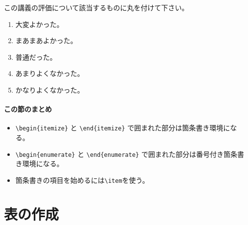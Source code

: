\vspace*{-1.5em}
\begin{kekka}
    この講義の評価について該当するものに丸を付けて下さい。
    \begin{enumerate}
        \item 大変よかった。
        \item まあまあよかった。
        \item 普通だった。
        \item あまりよくなかった。
        \item かなりよくなかった。
    \end{enumerate}
\end{kekka}


\paragraph{この節のまとめ}

\begin{itemize}
    \item \verb|\begin{itemize}| と \verb|\end{itemize}| で囲まれた部分は箇条書き環境になる。
    \item \verb|\begin{enumerate}| と \verb|\end{enumerate}| で囲まれた部分は番号付き箇条書き環境になる。
    \item 箇条書きの項目を始めるには\verb|\item|を使う。
\end{itemize}

\section{表の作成}
\label{sec:latex:table}

